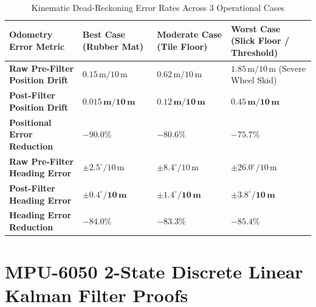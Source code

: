 \documentclass[11pt, a4paper]{article}
\begin{document}
\begin{table}[H]
\centering
\small
\begin{tabularx}{\textwidth}{L{3.4cm} Y Y Y}
\toprule
\textbf{Odometry Error Metric} & \textbf{Best Case (Rubber Mat)} & \textbf{Moderate Case (Tile Floor)} & \textbf{Worst Case (Slick Floor / Threshold)} \\
\midrule
\textbf{Raw Pre-Filter Position Drift} & $0.15\,\text{m} / 10\,\text{m}$ & $0.62\,\text{m} / 10\,\text{m}$ & $1.85\,\text{m} / 10\,\text{m}$ (Severe Wheel Skid) \\
\textbf{Post-Filter Position Drift} & $\mathbf{0.015\,\text{m} / 10\,\text{m}}$ & $\mathbf{0.12\,\text{m} / 10\,\text{m}}$ & $\mathbf{0.45\,\text{m} / 10\,\text{m}}$ \\
\textbf{Positional Error Reduction} & $\mathbf{-90.0\%}$ & $\mathbf{-80.6\%}$ & $\mathbf{-75.7\%}$ \\
\midrule
\textbf{Raw Pre-Filter Heading Error} & $\pm 2.5^\circ / 10\,\text{m}$ & $\pm 8.4^\circ / 10\,\text{m}$ & $\pm 26.0^\circ / 10\,\text{m}$ \\
\textbf{Post-Filter Heading Error} & $\mathbf{\pm 0.4^\circ / 10\,\text{m}}$ & $\mathbf{\pm 1.4^\circ / 10\,\text{m}}$ & $\mathbf{\pm 3.8^\circ / 10\,\text{m}}$ \\
\textbf{Heading Error Reduction} & $\mathbf{-84.0\%}$ & $\mathbf{-83.3\%}$ & $\mathbf{-85.4\%}$ \\
\bottomrule
\end{tabularx}
\caption{Kinematic Dead-Reckoning Error Rates Across 3 Operational Cases}
\label{tab:kinematics_error}
\end{table}

\newpage
\section{MPU-6050 2-State Discrete Linear Kalman Filter Proofs}
\end{document}
